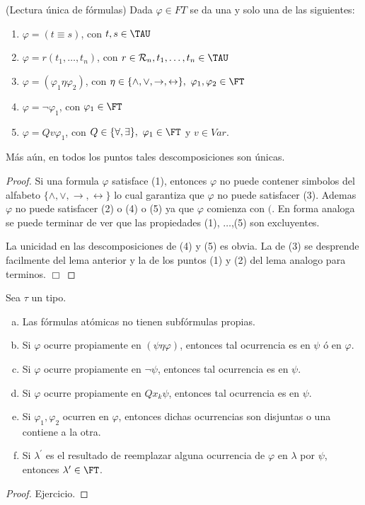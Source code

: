   \begin{theorem}
    \PN (Lectura única de fórmulas) Dada $\varphi \in FT$ se da una y solo una de las siguientes:
    \begin{enumerate}[(1)]
      \item $\varphi = (t \equiv s)$, con $t, s \in \TAU$
      \item $\varphi = r(t_{1}, \dotsc, t_{n})$, con $r \in \mathcal{R}_{n}, t_{1}, \dotsc, t_{n} \in \TAU$
      \item $\varphi = (\varphi_{1} \eta \varphi_{2})$, con $\eta \in \{\wedge, \vee, \rightarrow, \leftrightarrow\}, \
        \varphi_{1}, \varphi_{2} \in \FT$
      \item $\varphi = \lnot \varphi_{1}$, con $\varphi_{1} \in \FT$
      \item $\varphi = Qv \varphi_{1}$, con $Q \in \{\forall, \exists\}, \ \varphi_{1} \in \FT$ y $v \in Var$.
    \end{enumerate}

    \PN Más aún, en todos los puntos tales descomposiciones son únicas.
  \end{theorem}
  \begin{proof}
    Si una formula $\varphi $ satisface (1), entonces $\varphi $ no puede contener simbolos del alfabeto $\{\wedge ,\vee,
    \rightarrow ,\leftrightarrow \}$ lo cual garantiza que $\varphi $ no puede satisfacer (3). Ademas $ \varphi $ no
    puede satisfacer (2) o (4) o (5) ya que $\varphi $ comienza con $($. En forma analoga se puede terminar de ver que
    las propiedades (1), $\dotsc$,(5) son excluyentes.

    La unicidad en las descomposiciones de (4) y (5) es obvia. La de (3) se desprende facilmente del lema anterior y la de los puntos (1) y (2) del lema analogo para terminos. $\Box$
  \end{proof}

  \begin{lemma}
    \PN Sea $\tau$ un tipo.
    \begin{enumerate}[(a)]
      \item Las fórmulas atómicas no tienen subfórmulas propias.
      \item Si $\varphi$ ocurre propiamente en $(\psi \eta \varphi)$, entonces tal ocurrencia es en $\psi$ ó en
        $\varphi$.
      \item Si $\varphi$ ocurre propiamente en $\lnot \psi$, entonces tal ocurrencia es en $\psi$.
      \item Si $\varphi$ ocurre propiamente en $Qx_{k} \psi$, entonces tal ocurrencia es en $\psi$.
      \item Si $\varphi_{1}, \varphi_{2}$ ocurren en $\varphi$, entonces dichas ocurrencias son disjuntas o una contiene
        a la otra.
      \item Si $\lambda^{\prime}$ es el resultado de reemplazar alguna ocurrencia de $\varphi$ en $\lambda$ por $\psi$,
        entonces $\lambda^{\prime} \in \FT$.
    \end{enumerate}
  \end{lemma}
  \begin{proof}
    Ejercicio.
  \end{proof}
